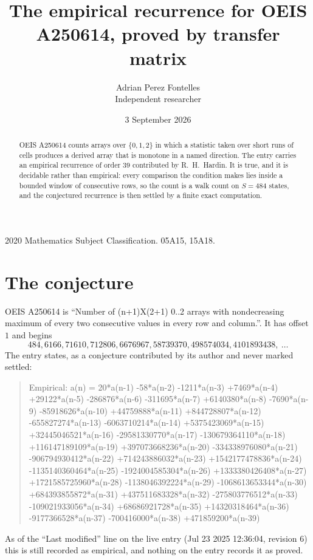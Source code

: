 \documentclass[11pt,a4paper]{article}
\title{The empirical recurrence for OEIS A250614, proved by transfer matrix}
\author{Adrian Perez Fontelles\\ \small Independent researcher}
\date{3 September 2026}
\theoremstyle{plain}
\theoremstyle{definition}
\begin{document}
\maketitle

\begin{abstract}
OEIS A250614 counts arrays over $\{0,1,2\}$ in which a statistic taken over short runs
of cells produces a derived array that is monotone in a named direction. The entry carries an
empirical recurrence of order $39$ contributed by R.~H.~Hardin. It is true, and it is
decidable rather than empirical: every comparison the condition makes lies inside a bounded
window of consecutive rows, so the count is a walk count on $S=484$ states, and the
conjectured recurrence is then settled by a finite exact computation.
\end{abstract}

\noindent\small 2020 Mathematics Subject Classification. 05A15, 15A18.\normalsize

\section{The conjecture}

OEIS A250614 is ``Number of (n+1)X(2+1) 0..2 arrays with nondecreasing maximum of every two consecutive values in every row and column.''. It has offset $1$ and begins
\[
484, 6166, 71610, 712806, 6676967, 58739370, 498574034, 4101893438,\ \dots
\]
The entry states, as a conjecture contributed by its author and never marked settled:
\begin{quote}
Empirical: a(n) = 20*a(n-1) -58*a(n-2) -1211*a(n-3) +7469*a(n-4) +29122*a(n-5) -286876*a(n-6) -311695*a(n-7) +6140380*a(n-8) -7690*a(n-9) -85918626*a(n-10) +44759888*a(n-11) +844728807*a(n-12) -655827274*a(n-13) -6063710214*a(n-14) +5375423069*a(n-15) +32445046521*a(n-16) -29581330770*a(n-17) -130679364110*a(n-18) +116147189109*a(n-19) +397073668236*a(n-20) -334338976080*a(n-21) -906794930412*a(n-22) +714243886032*a(n-23) +1542177478836*a(n-24) -1135140360464*a(n-25) -1924004585304*a(n-26) +1333380426408*a(n-27) +1721585725960*a(n-28) -1138046392224*a(n-29) -1068613653344*a(n-30) +684393855872*a(n-31) +437511683328*a(n-32) -275803776512*a(n-33) -109021933056*a(n-34) +68686921728*a(n-35) +14320318464*a(n-36) -9177366528*a(n-37) -700416000*a(n-38) +471859200*a(n-39)
\end{quote}
As of the ``Last modified'' line on the live entry (Jul 23 2025 12:36:04, revision 6) this is still
recorded as empirical, and nothing on the entry records it as proved.
\end{document}
